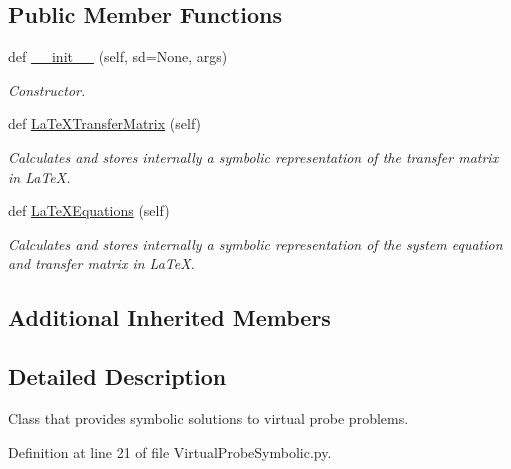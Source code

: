 \subsection*{Public Member Functions}
\begin{DoxyCompactItemize}
\item 
def \hyperlink{classSignalIntegrity_1_1SystemDescriptions_1_1VirtualProbeSymbolic_1_1VirtualProbeSymbolic_a72fa31992e716f60779f561f6cdbb4ce}{\+\_\+\+\_\+init\+\_\+\+\_\+} (self, sd=None, args)
\begin{DoxyCompactList}\small\item\em Constructor. \end{DoxyCompactList}\item 
def \hyperlink{classSignalIntegrity_1_1SystemDescriptions_1_1VirtualProbeSymbolic_1_1VirtualProbeSymbolic_adc83c150e43916083e3379cd4b9bb80e}{La\+Te\+X\+Transfer\+Matrix} (self)
\begin{DoxyCompactList}\small\item\em Calculates and stores internally a symbolic representation of the transfer matrix in La\+TeX. \end{DoxyCompactList}\item 
def \hyperlink{classSignalIntegrity_1_1SystemDescriptions_1_1VirtualProbeSymbolic_1_1VirtualProbeSymbolic_a3f6cd3290ceb07e8985e1eb832be3934}{La\+Te\+X\+Equations} (self)
\begin{DoxyCompactList}\small\item\em Calculates and stores internally a symbolic representation of the system equation and transfer matrix in La\+TeX. \end{DoxyCompactList}\end{DoxyCompactItemize}
\subsection*{Additional Inherited Members}


\subsection{Detailed Description}
Class that provides symbolic solutions to virtual probe problems. 



Definition at line 21 of file Virtual\+Probe\+Symbolic.\+py.



